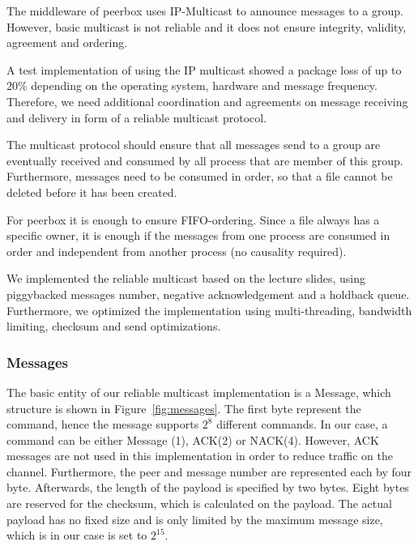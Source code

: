 The middleware of peerbox uses IP-Multicast to announce messages to a group. However, basic multicast is not reliable and it does not ensure integrity, validity, agreement and ordering.

A test implementation of using the IP multicast showed a package loss of up to 20\% depending on the operating system, hardware and message frequency. 
Therefore, we need additional coordination and agreements on message receiving and delivery in form of a reliable multicast protocol.


The multicast protocol should ensure that all messages send to a group are eventually received and consumed by all process that are member of this group. Furthermore, messages need to be consumed in order, so that a file cannot be deleted before it has been created. 

For peerbox it is enough to ensure FIFO-ordering. Since a file always has a specific owner, it is enough if the messages from one process are consumed in order and independent from another process (no causality required). 

We implemented the reliable multicast based on the lecture slides, using  piggybacked messages number, negative acknowledgement and a holdback queue. Furthermore, we optimized the implementation using  multi-threading, bandwidth limiting, checksum and send optimizations. 
    



 
% 
% 
% 
% 

\subsubsection{Messages}
The basic entity of our reliable multicast implementation is a Message, which structure is shown in Figure~\ref{fig:messages}. The first byte represent the command, hence the message supports $2^8$ different commands. In our case, a command can be either Message (1), ACK(2) or NACK(4). However, ACK messages are not used in this implementation in order to reduce traffic on the channel. Furthermore, the peer and message number are represented each by four byte. Afterwards, the length of the payload is specified by two bytes. Eight bytes are reserved for the checksum, which is calculated on the payload. The actual payload has no fixed size and is only limited by the maximum message size, which is in our case is set to $2^15$.


